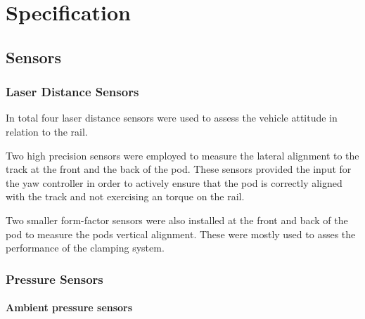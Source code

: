 
\chapter{Specification}


\section{Sensors}

\subsection{Laser Distance Sensors}

In total four laser distance sensors were used to assess the vehicle attitude in relation to the rail.

Two high precision sensors were employed to measure the lateral alignment to the track at the front and the back of the pod. These sensors provided the input for the yaw controller in order to actively ensure that the pod is correctly aligned with the track and not exercising an torque on the rail.

Two smaller form-factor sensors were also installed at the front and back of the pod to measure the pods vertical alignment. These were mostly used to asses the performance of the clamping system.

\subsection{Pressure Sensors}

\subsubsection{Ambient pressure sensors}

